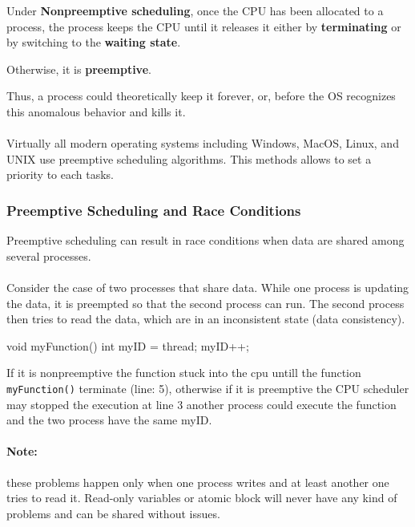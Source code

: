 Under \textbf{Nonpreemptive scheduling}, once the CPU has been
allocated to a process, the process keeps the CPU until it
releases it either by \textbf{terminating} or by switching to the \textbf{waiting
state}.

Otherwise, it is \textbf{preemptive}.

Thus, a process could theoretically keep it forever, or, before the OS recognizes this anomalous behavior
and kills it.

\paragraph{}
Virtually all modern operating systems including Windows, MacOS, Linux, and UNIX use preemptive scheduling algorithms.
This methods allows to set a priority to each tasks.

\subsubsection{Preemptive Scheduling and Race Conditions}

Preemptive scheduling can result in race conditions when data are
shared among several processes.

\paragraph{}

Consider the case of two processes that share data. While one
process is updating the data, it is preempted so that the second
process can run. The second process then tries to read the data,
which are in an inconsistent state (data consistency).

\begin{codeInC}
void myFunction(){
    int myID = thread;
    myID++;
}

\end{codeInC}

If it is nonpreemptive the function stuck into the cpu untill the function \verb|myFunction()| terminate (line: 5), otherwise if it is preemptive the CPU scheduler may stopped the execution at line 3 another process could execute the function and the two process have the same myID.

\paragraph{Note:} these problems happen only when one process writes and at
least another one tries to read it.
Read-only variables or atomic block will never have any kind of problems and can
be shared without issues.

